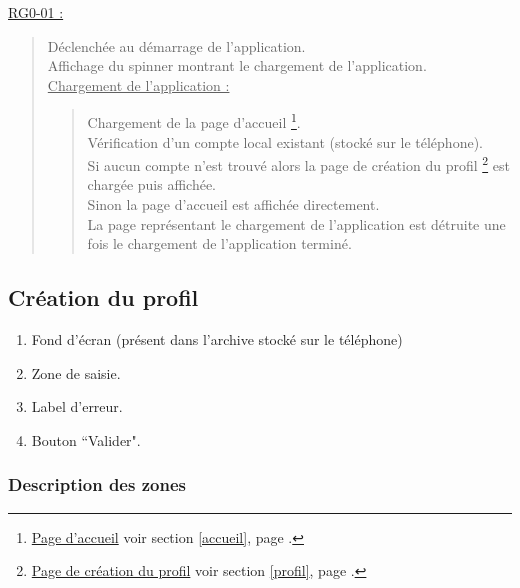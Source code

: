 \documentclass{report}
\begin{document}
		\underline{RG0-01 :}
		\begin{quote}
			Déclenchée au démarrage de l'application.\\
			Affichage du spinner montrant le chargement de l'application.\\
			\underline{Chargement de l'application :}
				\begin{quote}
					Chargement de la page d'accueil%
					\footnote[1]{
						\hyperlink{Page d'accueil}{Page d'accueil}
						\og voir section \ref{accueil}, page \pageref{accueil}.\fg
					}.\\
					Vérification d'un compte local existant (stocké sur le téléphone).\\
					Si aucun compte n'est trouvé alors la page de création du profil%
					\footnote[2]{
						\hyperlink{Création du profil}{Page de création du profil}
						\og voir section \ref{profil}, page \pageref{profil}.\fg
					}
					est chargée puis affichée.\\
					Sinon la page d'accueil%
					\footnotemark[1]
					est affichée directement. \\
					La page représentant le chargement de l'application est détruite une fois le chargement de l'application terminé.\\
				\end{quote}
		\end{quote}

	
\newpage

	\subsection{Création du profil}
		\hypertarget{profil}{}
		\label{profil}

		\begin{center}
			
		\end{center}

		\begin{enumerate}
		  \item Fond d'écran (présent dans l'archive stocké sur le téléphone)
		  \item Zone de saisie.
		  \item Label d'erreur.
		  \item Bouton ``Valider".
		\end{enumerate}

		\subsubsection{Description des zones}
				
\end{document}

